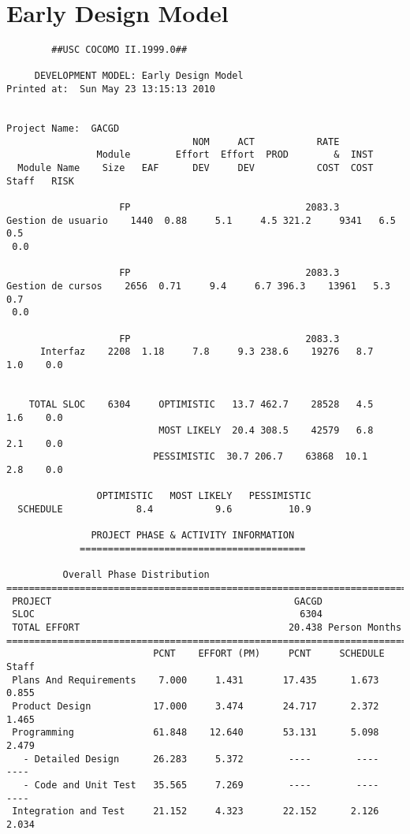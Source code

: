 \documentclass[11pt,a4paper,spanish,twoside]{report}
\begin{document}
\section{Early Design Model}
{\scriptsize
\begin{verbatim}
		##USC COCOMO II.1999.0##

	 DEVELOPMENT MODEL: Early Design Model
Printed at:  Sun May 23 13:15:13 2010


Project Name:  GACGD
                                 NOM     ACT           RATE             
                Module        Effort  Effort  PROD        &  INST
  Module Name    Size   EAF      DEV     DEV           COST  COST  Staff   RISK

                    FP                               2083.3             
Gestion de usuario    1440  0.88     5.1     4.5 321.2     9341   6.5    0.5   
 0.0

                    FP                               2083.3             
Gestion de cursos    2656  0.71     9.4     6.7 396.3    13961   5.3    0.7   
 0.0

                    FP                               2083.3             
      Interfaz    2208  1.18     7.8     9.3 238.6    19276   8.7    1.0    0.0


    TOTAL SLOC    6304     OPTIMISTIC   13.7 462.7    28528   4.5    1.6    0.0
                           MOST LIKELY  20.4 308.5    42579   6.8    2.1    0.0
                          PESSIMISTIC  30.7 206.7    63868  10.1    2.8    0.0

                OPTIMISTIC   MOST LIKELY   PESSIMISTIC
  SCHEDULE             8.4           9.6          10.9

		       PROJECT PHASE & ACTIVITY INFORMATION
		     ========================================

          Overall Phase Distribution
==============================================================================
 PROJECT                                           GACGD
 SLOC                                               6304
 TOTAL EFFORT                                     20.438 Person Months
==============================================================================
                          PCNT    EFFORT (PM)     PCNT     SCHEDULE       Staff
 Plans And Requirements    7.000     1.431       17.435      1.673       0.855
 Product Design           17.000     3.474       24.717      2.372       1.465
 Programming              61.848    12.640       53.131      5.098       2.479
   - Detailed Design      26.283     5.372        ----        ----        ----
   - Code and Unit Test   35.565     7.269        ----        ----        ----
 Integration and Test     21.152     4.323       22.152      2.126       2.034



\end{verbatim}}
\end{document}
